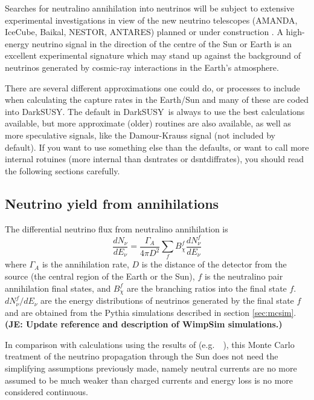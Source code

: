 \documentclass[a4paper,10pt,oneside]{book}
\newcommand{\joakim}[1]{{\color{red}\bf (JE: #1)}}
\newcommand{\beq}{\begin{equation}}
\newcommand{\eeq}{\end{equation}}
\newcommand{\code}[1]{\ft{#1}}
\newcommand{\ds}{{\sffamily DarkSUSY}}
\newcommand{\ft}[1]{\textsf{#1}}
\begin{document}
Searches for neutralino annihilation into neutrinos
will be subject to  extensive experimental investigations in view
of the new neutrino telescopes (AMANDA, IceCube, Baikal, NESTOR, ANTARES)
planned or under construction \cite{Halzen:1996su}. A high-energy
neutrino signal in the direction of the centre of the Sun or Earth
is an excellent experimental signature which may stand up against
the background of neutrinos generated by cosmic-ray interactions in the
Earth's atmosphere.

There are several different approximations one could do, or processes to
include when calculating the capture rates in the Earth/Sun and many of these
are coded into \ds. The default in \ds\ is always to use the best calculations
available, but more approximate (older) routines are also available,
as well as more speculative signals, like the Damour-Krauss signal
(not included by default). If you want to use something else than the
defaults, or want to call more internal rotuines (more internal than
\code{dsntrates} or \code{dsntdiffrates}), you should read the
following sections carefully.


\subsection{Neutrino yield from annihilations}

The differential neutrino flux from neutralino annihilation is
\beq
\frac{dN_\nu}{dE_\nu} =
\frac{\Gamma_A}{4\pi D^2} \sum_{f}
B^{f}_{\chi}\frac{dN^f_\nu}{dE_\nu}
\eeq
where $\Gamma_A$ is the annihilation rate,
$D$ is the distance of the detector from the source (the
central region of the Earth or the Sun), $f$ is the neutralino pair
annihilation final states,
and $B^{f}_{\chi}$ are the branching ratios into the final state $f$.
  $dN^f_\nu/dE_{\nu}$ are the energy
distributions of  neutrinos generated by the final state $f$ and are
obtained from the {\sc Pythia} simulations described in section
\ref{sec:mcsim}. \joakim{Update reference and description of WimpSim simulations.}

In comparison with calculations using the results of \cite{Ritz:1987mh}
(e.g.\ ~\cite{Giudice:1988vs,Halzen:1991kh,Drees:1993bh,Gandhi:1993ce,Bottino:1994xp,Jungman:1994jr,Berezinsky:1996ga}), this
Monte Carlo treatment of the neutrino propagation through the Sun
does not need the simplifying assumptions previously made, namely neutral
currents are no more assumed to be much weaker than charged currents
and energy loss is no more considered continuous.
\end{document}
